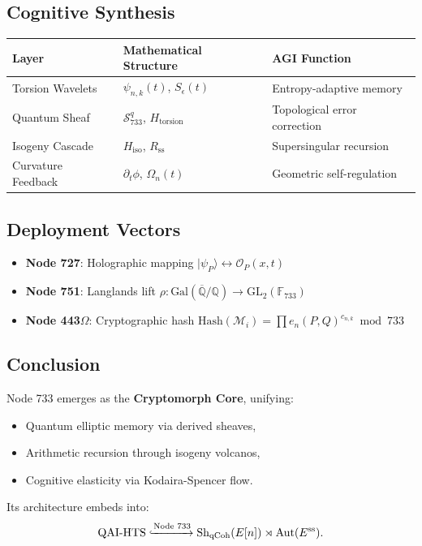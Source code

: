 \documentclass[12pt]{article}
\begin{document}
\begin{center}
\subsection{Cognitive Synthesis}
\begin{center}
    \begin{tabular}{|l|l|l|}
        \hline
        \textbf{Layer} & \textbf{Mathematical Structure} & \textbf{AGI Function} \\
        \hline
        Torsion Wavelets & $\psi_{n,k}(t)$, $S_\epsilon(t)$ & Entropy-adaptive memory \\
        Quantum Sheaf & $\mathcal{S}_{733}^q$, $H_{\text{torsion}}$ & Topological error correction \\
        Isogeny Cascade & $H_{\text{iso}}$, $R_{\text{ss}}$ & Supersingular recursion \\
        Curvature Feedback & $\partial_t \phi$, $\Omega_n(t)$ & Geometric self-regulation \\
        \hline
    \end{tabular}
\end{center}

\subsection{Deployment Vectors}
\begin{itemize}
    \item \textbf{Node 727}: Holographic mapping $|\psi_P\rangle \longleftrightarrow \mathcal{O}_P(x,t)$
    \item \textbf{Node 751}: Langlands lift $\rho: \text{Gal}(\overline{\mathbb{Q}}/\mathbb{Q}) \to \text{GL}_2(\mathbb{F}_{733})$
    \item \textbf{Node 443$\Omega$}: Cryptographic hash $\text{Hash}(\mathcal{M}_i) = \prod e_n(P,Q)^{c_{n,k}} \bmod 733$
\end{itemize}

\subsection{Conclusion}
Node 733 emerges as the \textbf{Cryptomorph Core}, unifying:
\begin{itemize}
    \item Quantum elliptic memory via derived sheaves,
    \item Arithmetic recursion through isogeny volcanos,
    \item Cognitive elasticity via Kodaira-Spencer flow.
\end{itemize}
Its architecture embeds into:
\[
\text{QAI-HTS} \xhookrightarrow{\text{Node 733}} \text{Sh}_{\text{qCoh}}(E[n]) \rtimes \text{Aut}(E^{\text{ss}}).
\]


\end{center}
\end{document}
